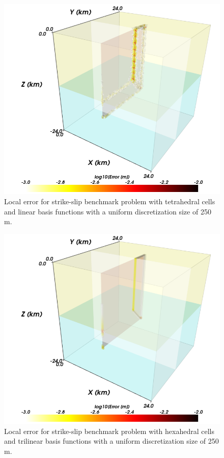 \begin{figure}[htbp]
  \includegraphics[scale=0.33]{benchmarks/figs/strikeslip_error_tet4_0250m}
  \caption{Local error for strike-slip benchmark problem with
    tetrahedral cells and linear basis functions with a uniform
    discretization size of 250 m.}
  \label{fig:benchmark:strikeslip:tet4:250m}
\end{figure}

\begin{figure}[htbp]
  \includegraphics[scale=0.33]{benchmarks/figs/strikeslip_error_hex8_0250m}
  \caption{Local error for strike-slip benchmark problem with
    hexahedral cells and trilinear basis functions with a uniform
    discretization size of 250 m.}
  \label{fig:benchmark:strikeslip:hex8:250m}
\end{figure}

